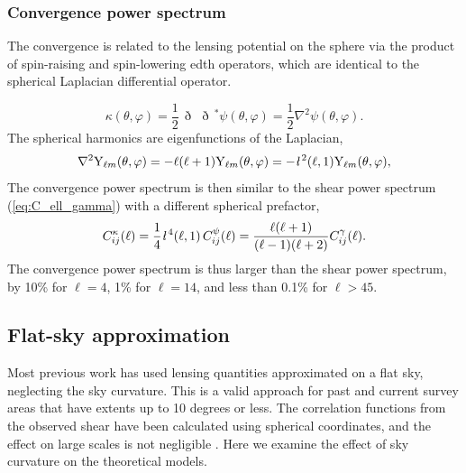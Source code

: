\documentclass[fleqn,usenatbib]{mnras} %
\newcommand{\ellbar}{\hbox{\it \l}\,}
\newcommand{\edth}{\,\eth\,}
\begin{document}
\subsubsection{Convergence power spectrum}

The convergence is related to the lensing potential on the sphere via the
product of spin-raising and spin-lowering edth operators, which are identical
to the spherical Laplacian differential operator.

%
\begin{equation}
  \kappa(\theta, \varphi) = \frac 1 2 \edth \edth^\ast \psi(\theta, \varphi) = \frac 1 2 \nabla^2 \psi(\theta, \varphi).
  \label{eq:kappa_psi_spher}
\end{equation}
%
The spherical harmonics are eigenfunctions of the Laplacian,
%
\begin{equation}
  \nabla^2 {\rm Y}_{\ell m}(\theta, \varphi) = - \ell (\ell + 1) {\rm Y}_{\ell m}(\theta, \varphi)
    = - \ellbar^2(\ell, 1) {\rm Y}_{\ell m}(\theta, \varphi),
  \label{eq:nabla_Ylm}
\end{equation}
%
The convergence power spectrum is then similar to the shear power spectrum
(\ref{eq:C_ell_gamma}) with a different spherical prefactor,
%
\begin{equation}
  C^\kappa_{ij}(\ell) = \frac 1 4 \ellbar^4(\ell, 1) \, C^\psi_{ij}(\ell)
    = \frac{\ell (\ell+1)}{(\ell-1)(\ell+2)} C^\gamma_{ij}(\ell) .
  \label{eq:C_ell_kappa_full}
\end{equation}
%
The convergence power spectrum is thus larger than the shear power spectrum, by
10\% for $\ell=4$, 1\% for $\ell = 14$, and less than 0.1\% for $\ell>45$.


\subsection{Flat-sky approximation}

Most previous work has used lensing quantities approximated on a flat sky,
neglecting the sky curvature. This is a valid approach for past and current
survey areas that have extents up to 10 degrees or less. The correlation
functions from the observed shear have been calculated using spherical
coordinates, and the effect on large scales is not negligible \cite{FSHK08}.
Here we examine the effect of sky curvature on the theoretical models.
\end{document}
